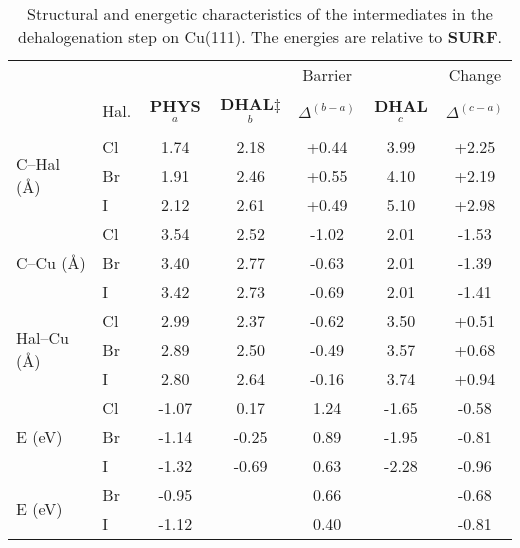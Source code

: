 \documentclass[aps,prl,reprint,amsmath,amssymb,floatfix,notitlepage]{revtex4-1}
\begin{document}
\begin{table*}
\centering
\caption{Structural and energetic characteristics of the intermediates in the dehalogenation step on Cu(111). The energies are relative to \textbf{SURF}.}
\label{table:bondlength}
\begin{tabular}{ llccccc  }
 \hline
 \hline
  & & & & Barrier & & Change \\
  & Hal. & \textbf{PHYS}$^{a}$ & \textbf{DHAL$\ddagger$}$^{b}$ & $\Delta^{(b-a)}$ & \textbf{DHAL}$^{c}$ & $\Delta^{(c-a)}$ \\ 
 \hline 
 \multirow{3}{*}{C--Hal (\si{\angstrom})} & Cl & 1.74 & 2.18 & +0.44 & 3.99 & +2.25 \\ 
 & Br & 1.91 & 2.46 & +0.55 & 4.10 &+2.19 \\ 
 & I & 2.12 & 2.61 & +0.49 & 5.10 &+2.98 \\ 
 \hline
 \multirow{3}{*}{C--Cu (\si{\angstrom}) } & Cl & 3.54 & 2.52 & -1.02 & 2.01 & -1.53 \\ 
 & Br & 3.40 & 2.77 & -0.63 & 2.01 & -1.39 \\ 
 & I &3.42 & 2.73 &-0.69 & 2.01 & -1.41 \\ 
 \hline
 \multirow{3}{*}{Hal--Cu (\si{\angstrom}) } & Cl & 2.99 & 2.37 & -0.62 & 3.50 & +0.51 \\ 
 & Br & 2.89 & 2.50 & -0.49 & 3.57 & +0.68 \\ 
 & I &2.80 & 2.64 &-0.16 & 3.74 & +0.94 \\ 
 \hline
 \multirow{3}{*}{E (\si{\electronvolt}) } & Cl & -1.07 & 0.17 & 1.24 &-1.65 & -0.58 \\ 
 & Br &-1.14 &-0.25 & 0.89 & -1.95& -0.81 \\ 
 & I  & -1.32 & -0.69 & 0.63 & -2.28& -0.96 \\ 
 \hline
 \multirow{2}{*}{E (\si{\electronvolt})~\cite{jacs2013}} & Br &-0.95 & & 0.66 & & -0.68 \\ 
 & I & -1.12 & & 0.40 & & -0.81 \\ 
 \hline
 \hline
\end{tabular}
\end{table*}
\end{document}
